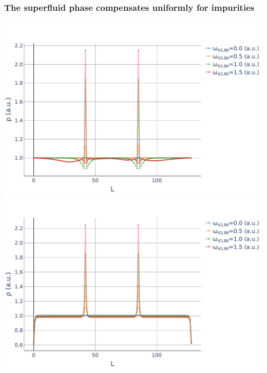 \documentclass[aspectratio=169]{beamer}
\begin{document}
\begin{frame}
  \frametitle{The superfluid phase compensates uniformly for impurities}
  \begin{center}
    \includegraphics[scale=0.22]{../img/Density-profiles-MI.pdf}
    \includegraphics[scale=0.22]{../img/Density-profiles-SF.pdf}
  \end{center}
\end{frame}
\end{document}
